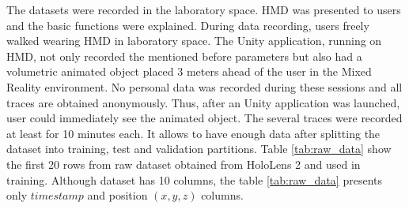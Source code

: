 The datasets were recorded in the laboratory space. HMD was presented to users and the basic functions were explained. During data recording, users freely walked wearing HMD in laboratory space. The Unity application, running on HMD, not only recorded the mentioned before parameters but also had a volumetric animated object placed 3 meters ahead of the user in the Mixed Reality environment. No personal data was recorded during these sessions and all traces are obtained anonymously. Thus, after an Unity application was launched, user could immediately see the animated object. The several traces were recorded at least for 10 minutes each. It allows to have enough data after splitting the dataset into training, test and validation partitions. Table \ref{tab:raw_data} show the first 20 rows from raw dataset obtained from HoloLens 2 and used in training. Although dataset has 10 columns, the table \ref{tab:raw_data} presents only $timestamp$ and position $(x, y, z)$ columns. 

